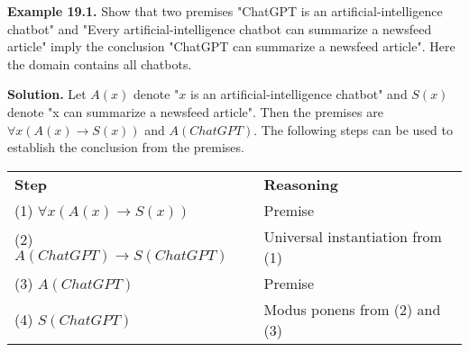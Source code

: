 \documentclass[aspectratio=169]{beamer}
\begin{document}
\begin{frame}[plain]{ }
 
 
 
   {\bf Example 19.1.} Show that two premises 
   "ChatGPT is an artificial-intelligence chatbot"
     and "Every artificial-intelligence chatbot can summarize a newsfeed article" 
     imply the conclusion
    "ChatGPT can summarize a newsfeed article".  
     Here the domain contains all chatbots.    
    \pause
    \smallskip
    
    {\bf Solution.} Let $A(x)$ denote "$x$ is an artificial-intelligence chatbot" 
      and $S(x)$ denote
      "x can summarize a newsfeed article". 
      Then the premises are $\forall x (A(x)\rightarrow S(x))$ and 
      $A(ChatGPT)$. 
      The following steps can be used to establish the conclusion from the premises.
      \begin{center}
      \begin{tabular}{ll}
        {\bf Step}   & {\bf Reasoning} \\ \pause 
      (1) $\forall x (A(x)\rightarrow S(x))$  & Premise\\ \pause 
      (2)  $A(ChatGPT)\rightarrow S(ChatGPT)$ & Universal instantiation from (1)\\ \pause 
      (3) $A(ChatGPT)$ & Premise\\ \pause 
      (4) $S(ChatGPT)$ & Modus ponens from (2) and (3)
     \end{tabular}
     \end{center}
     
\end{frame}
\end{document}
